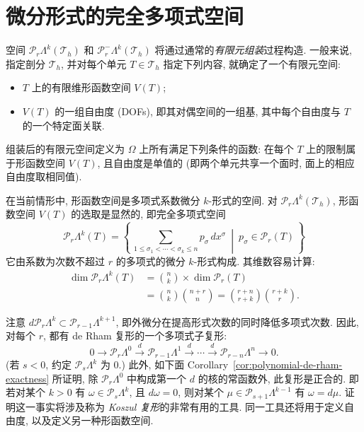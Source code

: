\section{{微分形式的完全多项式空间}}\label{sec:complete-polynomial-forms}

{空间 $\mathcal P_r\Lambda^k(\mathcal T_h)$ 和 $\mathcal P_r^-\Lambda^k(\mathcal T_h)$ 将通过通常的\emph{有限元组装}过程构造. 一般来说, 指定剖分 $\mathcal T_h$, 并对每个单元 $T\in\mathcal T_h$ 指定下列内容, 就确定了一个有限元空间:}
\begin{itemize}
\item{$T$ 上的有限维形函数空间 $V(T)$;}
\item{$V(T)$ 的一组自由度 (DOFs), 即其对偶空间的一组基, 其中每个自由度与 $T$ 的一个特定面关联.}
\end{itemize}

{组装后的有限元空间定义为 $\Omega$ 上所有满足下列条件的函数: 在每个 $T$ 上的限制属于形函数空间 $V(T)$, 且自由度是单值的 (即两个单元共享一个面时, 面上的相应自由度取相同值).}

{在当前情形中, 形函数空间是多项式系数微分 $k$-形式的空间. 对 $\mathcal P_r\Lambda^k(\mathcal T_h)$, 形函数空间 $V(T)$ 的选取是显然的, 即完全多项式空间}
\[
\mathcal P_r\Lambda^k(T)=\left\{\,\sum_{1\leq\sigma_1<\cdots<\sigma_k\leq n}p_\sigma\,dx^\sigma\ \middle|\ p_\sigma\in\mathcal P_r(T)\,\right\}
\]
{它由系数为次数不超过 $r$ 的多项式的微分 $k$-形式构成. 其维数容易计算:}
\begin{equation}\label{eq:complete-polynomial-form-dimension}
\begin{aligned}
\dim\mathcal P_r\Lambda^k(T)&=\binom nk\times\dim\mathcal P_r(T)\\
&=\binom nk\binom{n+r}n=\binom{r+n}{r+k}\binom{r+k}r.
\end{aligned}
\end{equation}

{注意 $d\mathcal P_r\Lambda^k\subset\mathcal P_{r-1}\Lambda^{k+1}$, 即外微分在提高形式次数的同时降低多项式次数. 因此, 对每个 $r$, 都有 de Rham 复形的一个多项式子复形:}
\[
0\to\mathcal P_r\Lambda^0\xrightarrow{d}\mathcal P_{r-1}\Lambda^1\xrightarrow{d}\cdots\xrightarrow{d}\mathcal P_{r-n}\Lambda^n\to0.
\]
{(若 $s<0$, 约定 $\mathcal P_s\Lambda^k$ 为 $0$.) 此外, 如下面 Corollary~\ref{cor:polynomial-de-rham-exactness} 所证明, 除 $\mathcal P_r\Lambda^0$ 中构成第一个 $d$ 的核的常函数外, 此复形是正合的. 即若对某个 $k>0$ 有 $\omega\in\mathcal P_s\Lambda^k$, 且 $d\omega=0$, 则对某个 $\mu\in\mathcal P_{s+1}\Lambda^{k-1}$ 有 $\omega=d\mu$. 证明这一事实将涉及称为 \emph{Koszul 复形}的非常有用的工具. 同一工具还将用于定义自由度, 以及定义另一种形函数空间.}
